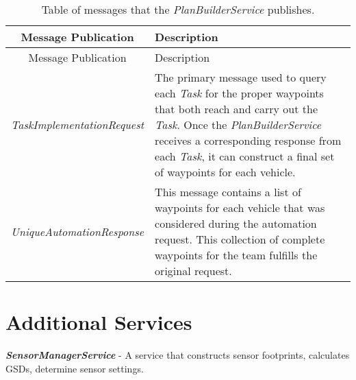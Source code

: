 \begin{longtable}[]{@{}cl@{}}
\caption{Table of messages that the \emph{PlanBuilderService}
publishes.}\tabularnewline
\toprule
\begin{minipage}[b]{0.40\columnwidth}\centering\strut
Message Publication\strut
\end{minipage} & \begin{minipage}[b]{0.55\columnwidth}\raggedright\strut
Description\strut
\end{minipage}\tabularnewline
\midrule
\endfirsthead
\toprule
\begin{minipage}[b]{0.40\columnwidth}\centering\strut
Message Publication\strut
\end{minipage} & \begin{minipage}[b]{0.55\columnwidth}\raggedright\strut
Description\strut
\end{minipage}\tabularnewline
\midrule
\endhead
\begin{minipage}[t]{0.40\columnwidth}\centering\strut
\emph{TaskImplementationRequest}\strut
\end{minipage} & \begin{minipage}[t]{0.55\columnwidth}\raggedright\strut
The primary message used to query each \emph{Task} for the proper
waypoints that both reach and carry out the \emph{Task}. Once the
\emph{PlanBuilderService} receives a corresponding response from each
\emph{Task}, it can construct a final set of waypoints for each
vehicle.\strut
\end{minipage}\tabularnewline
\begin{minipage}[t]{0.40\columnwidth}\centering\strut
\emph{UniqueAutomationResponse}\strut
\end{minipage} & \begin{minipage}[t]{0.55\columnwidth}\raggedright\strut
This message contains a list of waypoints for each vehicle that was
considered during the automation request. This collection of complete
waypoints for the team fulfills the original request.\strut
\end{minipage}\tabularnewline
\bottomrule
\end{longtable}

\section{Additional Services}\label{additional-services}

\textbf{\emph{SensorManagerService}} - A service that constructs sensor
footprints, calculates GSDs, determine sensor settings.

